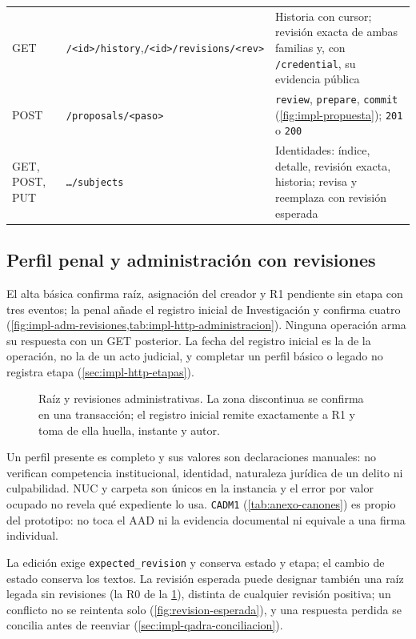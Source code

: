 \begin{table}[!t]
\begin{tabularx}{\linewidth}{@{}l L{6.3cm} >{\raggedright\arraybackslash}X@{}}
    GET & \texttt{/<id>/history},\newline\texttt{/<id>/revisions/<rev>} & Historia con cursor; revisión exacta de ambas familias y, con \texttt{/credential}, su evidencia pública \\
    POST & \texttt{/proposals/<paso>} & \texttt{review}, \texttt{prepare}, \texttt{commit} (\cref{fig:impl-propuesta}); \texttt{201} o \texttt{200} \\
    GET, POST, PUT & \texttt{\ldots/subjects} & Identidades: índice, detalle, revisión exacta, historia; revisa y reemplaza con revisión esperada \\
    \bottomrule
  \end{tabularx}
\end{table}

\subsection{Perfil penal y administración con revisiones}\label{sec:impl-http-administracion}

El alta básica confirma raíz, asignación del creador y R1 pendiente sin etapa con tres eventos; la penal añade el registro inicial de Investigación y confirma cuatro (\cref{fig:impl-adm-revisiones,tab:impl-http-administracion}). Ninguna operación arma su respuesta con un GET posterior. La fecha del registro inicial es la de la operación, no la de un acto judicial, y completar un perfil básico o legado no registra etapa (\cref{sec:impl-http-etapas}).

\begin{figure}[!htbp]
  \centering
  
  \caption{Raíz y revisiones administrativas. La zona discontinua se confirma en una transacción; el registro inicial remite exactamente a R1 y toma de ella huella, instante y autor.}
  \label{fig:impl-adm-revisiones}
\end{figure}

Un perfil presente es completo y sus valores son declaraciones manuales: no verifican competencia institucional, identidad, naturaleza jurídica de un delito ni culpabilidad. NUC y carpeta son únicos en la instancia y el error por valor ocupado no revela qué expediente lo usa. \texttt{CADM1} (\cref{tab:anexo-canones}) es propio del prototipo: no toca el AAD ni la evidencia documental ni equivale a una firma individual.

La edición exige \texttt{expected\_revision} y conserva estado y etapa; el cambio de estado conserva los textos. La revisión esperada puede designar también una raíz legada sin revisiones (la R0 de la \cref{fig:impl-adm-revisiones}), distinta de cualquier revisión positiva; un conflicto no se reintenta solo (\cref{fig:revision-esperada}), y una respuesta perdida se concilia antes de reenviar (\cref{sec:impl-qadra-conciliacion}).


